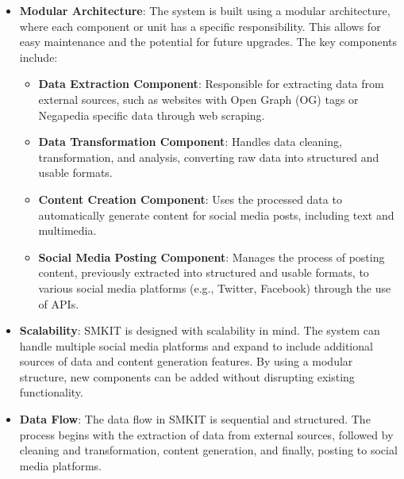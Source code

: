 \begin{itemize}
    \item \textbf{Modular Architecture}: The system is built using a modular architecture, where each component or unit has a specific responsibility. This allows for easy maintenance and the potential for future upgrades. The key components include:
    \begin{itemize}
        \item \textbf{Data Extraction Component}: Responsible for extracting data from external sources, such as websites with Open Graph (OG) tags or Negapedia specific data through web scraping.
        \item \textbf{Data Transformation Component}: Handles data cleaning, transformation, and analysis, converting raw data into structured and usable formats.
        \item \textbf{Content Creation Component}: Uses the processed data to automatically generate content for social media posts, including text and multimedia.
        \item \textbf{Social Media Posting Component}: Manages the process of posting content, previously extracted into structured and usable formats, to various social media platforms (e.g., Twitter, Facebook) through the use of APIs.
    \end{itemize}
    
    
    \item \textbf{Scalability}: SMKIT is designed with scalability in mind. The system can handle multiple social media platforms and expand to include additional sources of data and content generation features. By using a modular structure, new components can be added without disrupting existing functionality.
    
    \item \textbf{Data Flow}: The data flow in SMKIT is sequential and structured. The process begins with the extraction of data from external sources, followed by cleaning and transformation, content generation, and finally, posting to social media platforms.  
    
\end{itemize}

